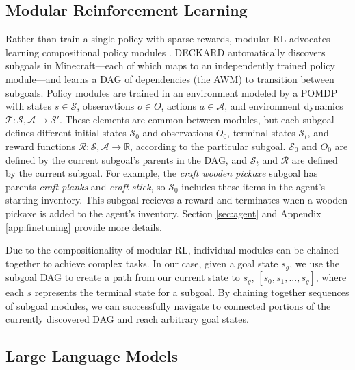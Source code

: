 \documentclass[nohyperref]{article}
\theoremstyle{plain}
\theoremstyle{definition}
\theoremstyle{remark}
\newcommand{\agentshort}{\textsc{DECKARD}}
\begin{document}
\subsection{Modular Reinforcement Learning}

Rather than train a single policy with sparse rewards, modular RL advocates learning compositional policy modules \cite{Simpkins_Isbell_2019}. 
\agentshort{} automatically discovers subgoals in Minecraft---each of which maps to an independently trained policy module---and learns a DAG of dependencies (the AWM) to transition between subgoals.
Policy modules are trained in an environment modeled by a POMDP with states $s \in \mathcal{S}$, obseravtions $o \in O$, actions $a \in \mathcal{A}$, and environment dynamics $\mathcal{T}: \mathcal{S}, \mathcal{A} \to \mathcal{S}'$.
These elements are common between modules, but each subgoal defines different initial states $\mathcal{S}_0$ and observations $O_0$, terminal states $\mathcal{S}_t$, and reward functions $\mathcal{R}: \mathcal{S}, \mathcal{A} \to \mathbb{R}$, according to the particular subgoal. 
$\mathcal{S}_0$ and $O_0$ are defined by the current subgoal's parents in the DAG, and $\mathcal{S}_t$ and $\mathcal{R}$ are defined by the current subgoal.
For example, the \emph{craft wooden pickaxe} subgoal has parents \emph{craft planks} and \emph{craft stick}, so $\mathcal{S}_0$ includes these items in the agent's starting inventory.
This subgoal recieves a reward and terminates when a wooden pickaxe is added to the agent's inventory.
Section \ref{sec:agent} and Appendix \ref{app:finetuning} provide more details.

Due to the compositionality of modular RL, individual modules can be chained together to achieve complex tasks.
In our case, given a goal state $s_g$, we use the subgoal DAG to create a path from our current state to $s_g$, $[s_0, s_1, ..., s_g]$, where each $s$ represents the terminal state for a subgoal.
By chaining together sequences of subgoal modules, we can successfully navigate to connected portions of the currently discovered DAG and reach arbitrary goal states.

\subsection{Large Language Models}
\label{sec:llm}
\end{document}
